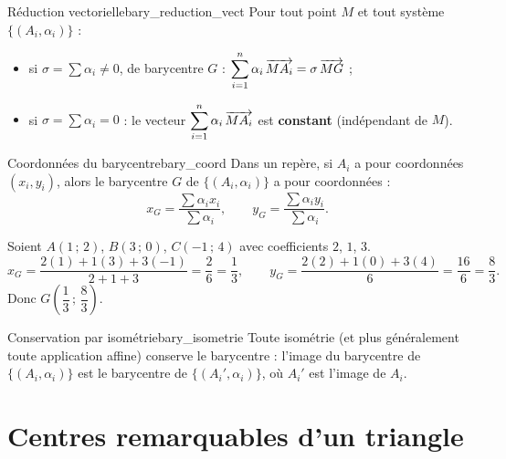 \begin{propriete}{Réduction vectorielle}{bary_reduction_vect}
	Pour tout point $M$ et tout système $\{(A_i, \alpha_i)\}$ :
	\begin{itemize}[label=\textbullet]
		\item si $\sigma = \sum \alpha_i \neq 0$, de barycentre $G$ :
		$\displaystyle\sum_{i=1}^{n} \alpha_i\,\overrightarrow{MA_i} = \sigma\,\overrightarrow{MG}$ ;
		\item si $\sigma = \sum \alpha_i = 0$ : le vecteur
		$\displaystyle\sum_{i=1}^{n} \alpha_i\,\overrightarrow{MA_i}$ est \textbf{constant}
		(indépendant de $M$).
	\end{itemize}
\end{propriete}

\begin{propriete}{Coordonnées du barycentre}{bary_coord}
	Dans un repère, si $A_i$ a pour coordonnées $(x_i, y_i)$, alors le barycentre
	$G$ de $\{(A_i, \alpha_i)\}$ a pour coordonnées :
	$$
	x_G = \frac{\sum \alpha_i x_i}{\sum \alpha_i},
	\qquad
	y_G = \frac{\sum \alpha_i y_i}{\sum \alpha_i}.
	$$
\end{propriete}

\begin{exemple}
	Soient $A(1\,;\,2)$, $B(3\,;\,0)$, $C(-1\,;\,4)$ avec coefficients $2$, $1$, $3$.
	$$
	x_G = \frac{2(1) + 1(3) + 3(-1)}{2+1+3} = \frac{2}{6} = \frac{1}{3},
	\qquad
	y_G = \frac{2(2) + 1(0) + 3(4)}{6} = \frac{16}{6} = \frac{8}{3}.
	$$
	Donc $G\!\left(\dfrac{1}{3}\,;\,\dfrac{8}{3}\right)$.
\end{exemple}

\begin{propriete}{Conservation par isométrie}{bary_isometrie}
	Toute isométrie (et plus généralement toute application affine) conserve le
	barycentre : l'image du barycentre de $\{(A_i,\alpha_i)\}$ est le barycentre
	de $\{(A_i',\alpha_i)\}$, où $A_i'$ est l'image de $A_i$.
\end{propriete}


\section{Centres remarquables d'un triangle}

